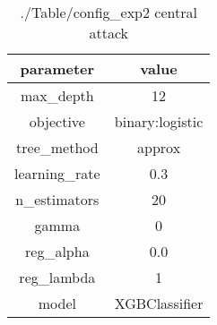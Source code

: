 \begin{table}[h]
\centering
\begin{tabular}{|c|c|}
\hline
parameter & value\\
\hline
max_depth & 12 \\\hline
objective & binary:logistic \\\hline
tree_method & approx \\\hline
learning_rate & 0.3 \\\hline
n_estimators & 20 \\\hline
gamma & 0 \\\hline
reg_alpha & 0.0 \\\hline
reg_lambda & 1 \\\hline
model & XGBClassifier \\\hline

\end{tabular}\caption{./Table/config_exp2 central attack}
\label{tab:./Table/config_exp2 central attack}
\end{table}
